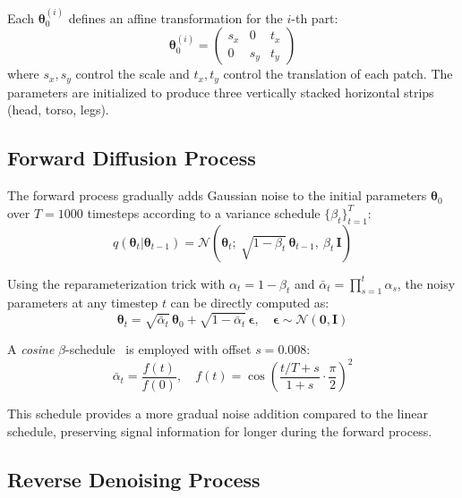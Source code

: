 Each $\boldsymbol{\theta}_0^{(i)}$ defines an affine transformation for the $i$-th part:
\begin{equation}
    \boldsymbol{\theta}_0^{(i)} = \begin{pmatrix} s_x & 0 & t_x \\ 0 & s_y & t_y \end{pmatrix}
\end{equation}
where $s_x, s_y$ control the scale and $t_x, t_y$ control the translation of each patch. The parameters are initialized to produce three vertically stacked horizontal strips (head, torso, legs).

\subsection{Forward Diffusion Process}

The forward process gradually adds Gaussian noise to the initial parameters $\boldsymbol{\theta}_0$ over $T = 1000$ timesteps according to a variance schedule $\{\beta_t\}_{t=1}^{T}$:
\begin{equation}
    q(\boldsymbol{\theta}_t | \boldsymbol{\theta}_{t-1}) = \mathcal{N}\left(\boldsymbol{\theta}_t;\ \sqrt{1-\beta_t}\,\boldsymbol{\theta}_{t-1},\ \beta_t\,\mathbf{I}\right)
\end{equation}

Using the reparameterization trick with $\alpha_t = 1 - \beta_t$ and $\bar{\alpha}_t = \prod_{s=1}^{t}\alpha_s$, the noisy parameters at any timestep $t$ can be directly computed as:
\begin{equation}
    \boldsymbol{\theta}_t = \sqrt{\bar{\alpha}_t}\,\boldsymbol{\theta}_0 + \sqrt{1 - \bar{\alpha}_t}\,\boldsymbol{\epsilon}, \quad \boldsymbol{\epsilon} \sim \mathcal{N}(\mathbf{0}, \mathbf{I})
\end{equation}

A \textit{cosine} $\beta$-schedule~\cite{ho2020denoising} is employed with offset $s = 0.008$:
\begin{equation}
    \bar{\alpha}_t = \frac{f(t)}{f(0)}, \quad f(t) = \cos\left(\frac{t/T + s}{1 + s} \cdot \frac{\pi}{2}\right)^2
\end{equation}

This schedule provides a more gradual noise addition compared to the linear schedule, preserving signal information for longer during the forward process.

\subsection{Reverse Denoising Process}

